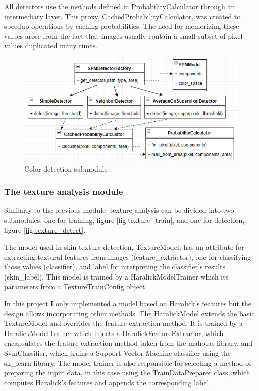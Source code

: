 \documentclass[12pt]{report}
\begin{document}
	All detectors use the methods defined in ProbabilityCalculator through an intermediary layer. This proxy, CachedProbabilityCalculator, was created to speedup operations by caching probabilities. The need for memorizing these values arose from the fact that images usually contain a small subset of pixel values duplicated many times.
	
	\begin{figure}[h!]
		\centering
		\includegraphics[]{design/color_detect.png}
		\caption{Color detection submodule}
		\label{fig:color_detect}
	\end{figure}
	
	\subsubsection{The texture analysis module}
	Similarly to the previous module, texture analysis can be divided into two submodules, one for training, figure \ref{fig:texture_train}, and one for detection, figure \ref{fig:texture_detect}.
	
	The model used in skin texture detection, TextureModel, has an attribute for extracting textural features from images (feature\_extractor), one for classifying those values (classifier), and label for interpreting the classifier's results (skin\_label). This model is trained by a HaralickModelTrainer which its parameters from a TextureTrainConfig object.
	
	In this project I only implemented a model based on Haralick's features but the design allows incorporating other methods. The HaralickModel extends the basic TextureModel and overrides the feature extraction method. It is trained by a HaralickModelTrainer which injects a HaralickFeatureExtractor, which encapsulates the feature extraction method taken from the mahotas library, and SvmClassifier, which trains a Support Vector Machine classifier using the sk\_learn library. The model trainer is also responsible for selecting a method of preparing the input data, in this case using the TrainDataPreparer class, which computes Haralick's features and appends the corresponding label.
	
\end{document}
